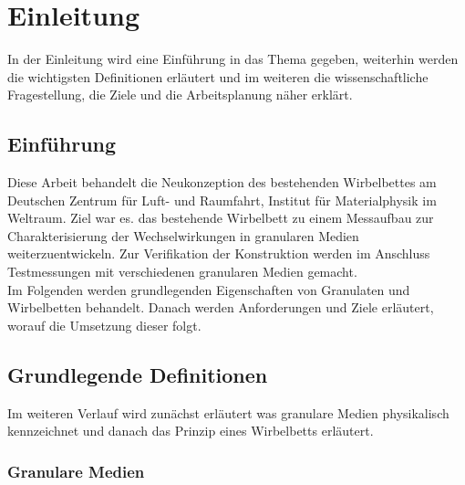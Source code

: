 \chapter{Einleitung}

In der Einleitung wird eine Einführung in das Thema gegeben, weiterhin werden die wichtigsten Definitionen erläutert und im weiteren die wissenschaftliche Fragestellung, die Ziele und die Arbeitsplanung näher erklärt.

\section{Einführung}

Diese Arbeit behandelt die Neukonzeption des bestehenden Wirbelbettes am Deutschen Zentrum für Luft- und Raumfahrt, Institut für Materialphysik im Weltraum. Ziel war es. das bestehende Wirbelbett zu einem Messaufbau zur Charakterisierung der Wechselwirkungen in granularen Medien weiterzuentwickeln. Zur Verifikation der Konstruktion werden im Anschluss Testmessungen mit verschiedenen granularen Medien gemacht. \\
Im Folgenden werden grundlegenden Eigenschaften von Granulaten und Wirbelbetten behandelt. Danach werden Anforderungen und Ziele erläutert, worauf die Umsetzung dieser folgt.


\section{Grundlegende Definitionen}

Im weiteren Verlauf wird zunächst erläutert was granulare Medien physikalisch kennzeichnet und danach das Prinzip eines Wirbelbetts erläutert.

\subsection{Granulare Medien}

